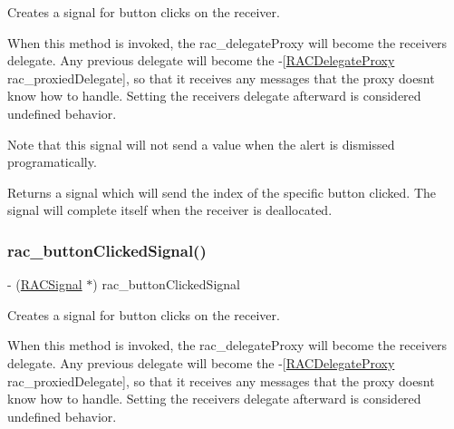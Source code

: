 Creates a signal for button clicks on the receiver.

When this method is invoked, the {\ttfamily rac\+\_\+delegate\+Proxy} will become the receiver\textquotesingle{}s delegate. Any previous delegate will become the -\/\mbox{[}\mbox{\hyperlink{interface_r_a_c_delegate_proxy}{R\+A\+C\+Delegate\+Proxy}} rac\+\_\+proxied\+Delegate\mbox{]}, so that it receives any messages that the proxy doesn\textquotesingle{}t know how to handle. Setting the receiver\textquotesingle{}s {\ttfamily delegate} afterward is considered undefined behavior.

Note that this signal will not send a value when the alert is dismissed programatically.

Returns a signal which will send the index of the specific button clicked. The signal will complete itself when the receiver is deallocated. \mbox{\label{category_u_i_alert_view_07_r_a_c_signal_support_08_afc61c8b02f0adc4622f827eef4a8c2af}} 
\subsubsection{\texorpdfstring{rac\+\_\+button\+Clicked\+Signal()}{rac\_buttonClickedSignal()}\hspace{0.1cm}{\footnotesize\ttfamily [3/3]}}
{\footnotesize\ttfamily -\/ (\mbox{\hyperlink{interface_r_a_c_signal}{R\+A\+C\+Signal}} $\ast$) rac\+\_\+button\+Clicked\+Signal \begin{DoxyParamCaption}{ }\end{DoxyParamCaption}}

Creates a signal for button clicks on the receiver.

When this method is invoked, the {\ttfamily rac\+\_\+delegate\+Proxy} will become the receiver\textquotesingle{}s delegate. Any previous delegate will become the -\/\mbox{[}\mbox{\hyperlink{interface_r_a_c_delegate_proxy}{R\+A\+C\+Delegate\+Proxy}} rac\+\_\+proxied\+Delegate\mbox{]}, so that it receives any messages that the proxy doesn\textquotesingle{}t know how to handle. Setting the receiver\textquotesingle{}s {\ttfamily delegate} afterward is considered undefined behavior.

